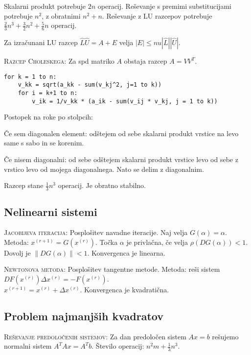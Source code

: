 \documentclass[a4paper,10pt]{article}
\theoremstyle{definition}
\newenvironment{enumerate*}%
{
\vspace{-6pt}
\begin{enumerate}
\setlength{\itemsep}{0pt}
\setlength{\parskip}{2pt}
}
{\end{enumerate}}
\begin{document}
Skalarni produkt potrebuje $2n$ operacij. Reševanje s premimi substitucijami
potrebuje $n^2$, z obratnimi $n^2+n$. Reševanje z LU razcepov potrebuje
$\frac23n^3 + \frac32n^2 + \frac56n$ operacij.

Za izračunani LU razcep $\hat{L}\hat{U} = A + E$ velja $|E| \leq
nu|\hat{L}||\hat{U}|$.

\textsc{Razcep Choleskega:}
Za spd matriko $A$ obstaja razcep $A = VV^T$.
\begin{verbatim}
for k = 1 to n:
    v_kk = sqrt(a_kk - sum(v_kj^2, j=1 to k))
    for i = k+1 to n:
        v_ik = 1/v_kk * (a_ik - sum(v_ij * v_kj, j = 1 to k))
\end{verbatim}
Postopek na roke po stolpcih:
\begin{enumerate*}
  \item Če sem diagonalen element: odštejem od sebe skalarni produkt vrstice na
    levo same s sabo in se korenim.
  \item Če nisem diagonalni: od sebe odštejem skalarni produkt vrstice levo od
    sebe z vrstico levo od mojega diagonalnega. Nato se delim z
    diagonalnim.
\end{enumerate*}

Razcep stane $\frac13n^3$ operacij. Je obratno stabilno.

\subsection*{Nelinearni sistemi}

\textsc{Jacobijeva iteracija:}
Posplošitev navadne iteracije. Naj velja $G(\alpha)= \alpha$. Metoda: $x^{(r+1)}
= G(x^{(r)})$. Točka $\alpha$ je privlačna, če velja $\rho(DG(\alpha)) < 1$.
Dovolj je $\|DG(\alpha)\| < 1$.  Konvergenca je linearna.

\textsc{Newtonova metoda:}
Posplošitev tangentne metode. Metoda: reši sistem $DF(x^{(r)})\Delta x^{(r)} =
-F(x^{(r)})$. \\ $x^{(r+1)} = x^{(r)} + \Delta x^{(r)}$. Konvergenca je
kvadratična.

\subsection*{Problem najmanjših kvadratov}

\textsc{Reševanje predoločenih sistemov:} Za dan predoločen sistem $Ax=b$
rešujemo normalni sistem $A^TAx=A^Tb$.
Število operacij: $n^2m + \frac13n^3$.
\end{document}
